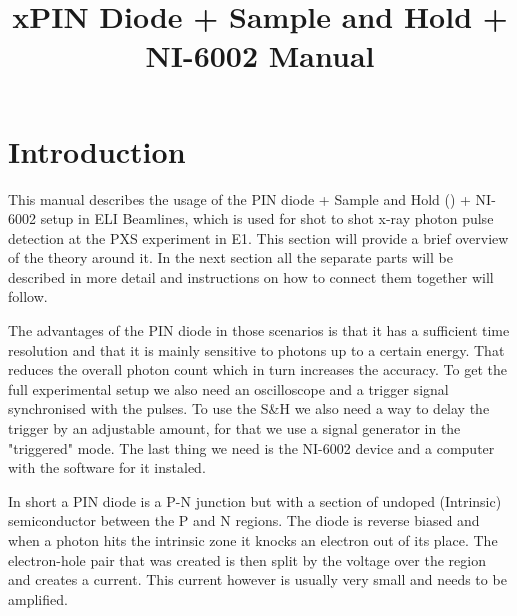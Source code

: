 \documentclass[a4paper, 10pt]{article}
\title{xPIN Diode + Sample and Hold + NI-6002 Manual}
\begin{document}
\maketitle

\vspace*{15em}

\tableofcontents

\newpage

\section{Introduction}
This manual describes the usage of the PIN diode + Sample and Hold () + NI-6002 setup in ELI Beamlines, which is used for shot to shot x-ray photon pulse detection at the PXS experiment in E1.
This section will provide a brief overview of the theory around it.
In the next section all the separate parts will be described in more detail and instructions on how to connect them together will follow.

The advantages of the PIN diode in those scenarios is that it has a sufficient time resolution and that it is mainly sensitive to photons up to a certain energy.
That reduces the overall photon count which in turn increases the accuracy.
To get the full experimental setup we also need an oscilloscope and a trigger signal synchronised with the pulses.
To use the S\&H we also need a way to delay the trigger by an adjustable amount, for that we use a signal generator in the "triggered" mode.
The last thing we need is the NI-6002 device and a computer with the software for it instaled.


In short a PIN diode is a P-N junction but with a section of undoped (Intrinsic) semiconductor between the P and N regions.
The diode is reverse biased and when a photon hits the intrinsic zone it knocks an electron out of its place.
The electron-hole pair that was created is then split by the voltage over the region and creates a current.
This current however is usually very small and needs to be amplified.
\end{document}
